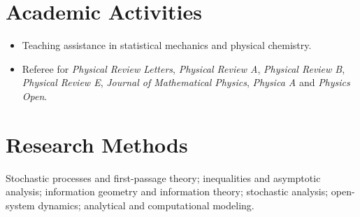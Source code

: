 \documentclass[10pt,a4paper]{article}
\begin{document}
\section{Academic Activities}

\begin{itemize}
  \item Teaching assistance in statistical mechanics and physical chemistry.
  \item Referee for \emph{Physical Review Letters}, \emph{Physical Review A}, \emph{Physical Review B}, \emph{Physical Review E}, \emph{Journal of Mathematical Physics}, \emph{Physica A} and \emph{Physics Open}.
\end{itemize}

\section{Research Methods}

Stochastic processes and first-passage theory; inequalities and asymptotic analysis; information geometry and information theory; stochastic analysis; open-system dynamics; analytical and computational modeling.
\end{document}

